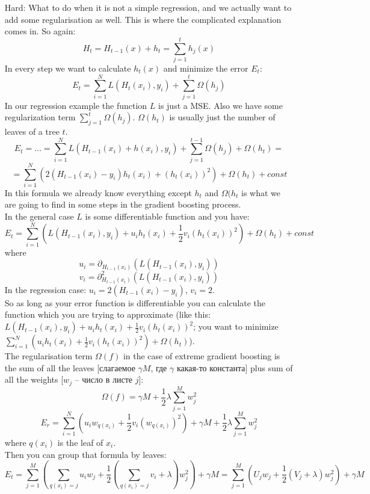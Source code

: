\begin{enumerate}
  {\it <Some talk about libraries. I'm not motivated enough to process that speech.>}
  \item[Hard:] What to do when it is not a simple regression, and we actually want to add some regularisation as well. This is where the complicated explanation comes in. So again:
  $$H_t=H_{t-1}(x)+h_t=\sum\limits_{j=1}^t h_j(x)$$
  In every step we want to calculate $h_t(x)$ and minimize the error $E_t$:
  $$E_t=\sum\limits_{i=1}^{N}L(H_t(x_i),y_i) + \sum\limits_{j=1}^t \Omega(h_j)$$
  In our regression example the function $L$ is just a MSE. Also we have some regularization term $\sum_{j=1}^t \Omega(h_j)$. $\Omega(h_t)$ is usually just the number of leaves of a tree $t$.
  $$E_t=\ldots=\sum\limits_{i=1}^{N}L(H_{t-1}(x_i) + h(x_i),y_i) + \sum\limits_{j=1}^{t-1} \Omega(h_j)+\Omega(h_t)=$$
  $$=\sum\limits_{i=1}^N\left(2(H_{t-1}(x_i)-y_i)h_t(x_i)+(h_t(x_i))^2\right)+\Omega(h_t)+const$$
  In this formula we already know everything except $h_t$ and $\Omega(h_t$ is what we are going to find in some steps in the gradient boosting process.\\
  In the general case $L$ is some differentiable function and you have:
  $$E_t=\sum\limits_{i=1}^N\left(L(H_{t-1}(x_i), y_i)+u_ih_t(x_i)+\frac{1}{2}v_i(h_t(x_i))^2\right)+\Omega(h_t)+const$$
  where
  $$u_i=\partial_{H_{t-1}(x_i)}\left(L(H_{t-1}(x_i), y_i)\right)$$
  $$v_i=\partial_{H_{t-1}(x_i)}^2\left(L(H_{t-1}(x_i), y_i)\right)$$
  In the regression case: $u_i=2(H_{t-1}(x_i)-y_i)$, $v_i=2$. \\
  So as long as your error function is differentiable you can calculate the function which you are trying to approximate (like this: $L(H_{t-1}(x_i), y_i)+u_ih_t(x_i)+\frac{1}{2}v_i(h_t(x_i))^2$; you want to minimize $\sum_{i=1}^N \left(u_ih_t(x_i)+\frac{1}{2}v_i(h_t(x_i))^2\right) + \Omega(h_t)$).\\
  The regularisation term $\Omega(f)$ in the case of extreme gradient boosting is the sum of all the leaves [слагаемое $\gamma M$, где $\gamma$ какая-то константа] plus sum of all the weights [$w_j$ -- число в листе $j$]:
  $$\Omega(f)=\gamma M+\frac{1}{2}\lambda\sum\limits_{j=1}^{M}w_j^2$$
  $$E_r=\sum\limits_{i=1}^{N}\left(u_iw_{q(x_i)}+\frac{1}{2}v_i(w_{q(x_i)})^2\right)+\gamma M + \frac{1}{2}\lambda\sum\limits_{j=1}^{M}w_j^2$$
  where $q(x_i)$ is the leaf of $x_i$.\\
  Then you can group that formula by leaves:
  $$E_t=\sum\limits_{j=1}^{M}\left(\sum\limits_{q(x_i)=j}u_iw_j+\frac{1}{2}\left(\sum\limits_{q(x_i)=j}v_i+\lambda\right)w_j^2\right)+\gamma M=\sum\limits_{j=1}^M\left(U_jw_j+\frac{1}{2}(V_j+\lambda)w_j^2\right)+\gamma M$$

\end{enumerate}
